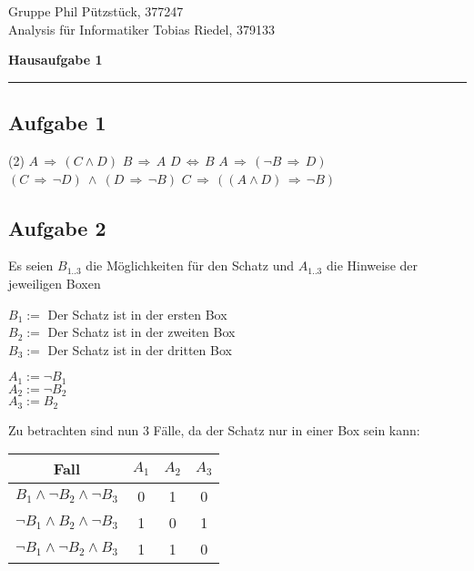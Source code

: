 \documentclass[a4paper,graphics,11pt]{article}
\newcommand\aufgabe[1]{\subsection*{Aufgabe #1}}
\begin{document}
\noindent Gruppe              \hfill Phil Pützstück, 377247 \\
\noindent Analysis für Informatiker             \hfill Tobias Riedel, 379133\\

\begin{center}
	\LARGE{\textbf{Hausaufgabe 1}}
\end{center}
\begin{center}
\rule[0.1ex]{\textwidth}{1pt}
\end{center}



\aufgabe{1}
\begin{tasks}(2)
    \task $A \,\Rightarrow\,(C \land D)$
    \task $B \,\Rightarrow\,A$
    \task $D \,\Leftrightarrow\, B$
    \task $A \,\Rightarrow\,(\lnot B\,\Rightarrow\,D)$
    \task $(C \,\Rightarrow\, \lnot D)\ \land\ (D \,\Rightarrow\, \lnot B)$ 
    \task $C \,\Rightarrow\,((A \land D)\,\Rightarrow\, \lnot B)$
\end{tasks}


\aufgabe{2}
Es seien $B_{1..3}$ die Möglichkeiten für den Schatz und $A_{1..3}$ die Hinweise der jeweiligen Boxen

\begin{minipage}{0.5\linewidth}
    $B_{1}:= $ Der Schatz ist in der ersten Box \\
    $B_{2}:= $ Der Schatz ist in der zweiten Box \\
    $B_{3}:= $ Der Schatz ist in der dritten Box \\
\end{minipage}
\begin{minipage}{0.5\linewidth}
    $A_{1}:= \lnot B_{1}$ \\
    $A_{2}:= \lnot B_{2}$ \\
    $A_{3}:= B_{2}$ \\
\end{minipage}

Zu betrachten sind nun 3 Fälle, da der Schatz nur in einer Box sein kann:
\begin{center}
    \begin{tabular}{|c|c|c|c|}
        \hline
        Fall & $A_{1}$ & $A_{2}$ & $A_{3}$ \\
        \hline
        $B_{1} \land \lnot B_{2} \land \lnot B_{3}$ & 0 & 1 & 0 \\
        \hline
        $\lnot B_{1} \land B_{2} \land \lnot B_{3}$ & 1 & 0 & 1 \\
        \hline
        $\lnot B_{1} \land \lnot B_{2} \land B_{3}$ & 1 & 1 & 0 \\
        \hline
    \end{tabular}
\end{center}
\end{document}
